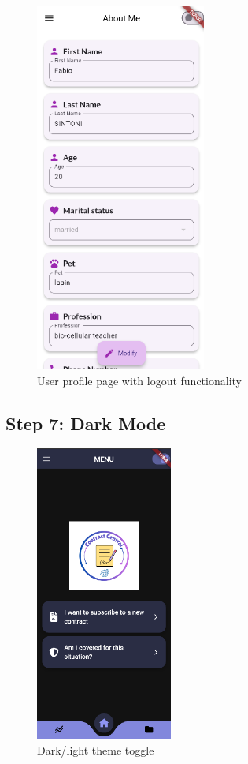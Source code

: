 \begin{figure}[H]
    \centering
    \includegraphics[width=0.5\textwidth]{frontend/profile_page.png}
    \caption{User profile page with logout functionality}
\end{figure}

\subsection*{Step 7: Dark Mode}

\begin{figure}[H]
    \centering
    \includegraphics[width=0.4\textwidth]{frontend/dark_mode_toggle.png}
    \caption{Dark/light theme toggle}
\end{figure}


